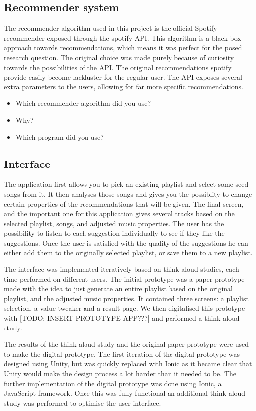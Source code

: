 \documentclass[sigconf,nonacm]{acmart}
\begin{document}
\subsection{Recommender system}
The recommender algorithm used in this project is the official Spotify recommender exposed through the spotify API. This algorithm is a black box approach towards recommendations, which means it was perfect for the posed research question. 
The original choice was made purely because of curiosity towards the possibilities of the API. The original recommendations spotify provide easily become lackluster for the regular user. The API exposes several extra parameters to the users, allowing for far more specific recommendations.
\begin{itemize}
    \item Which recommender algorithm did you use?
    \item Why?
    \item Which program did you use?
\end{itemize}

\subsection{Interface}
The application first allows you to pick an existing playlist and select some seed songs from it. It then analyses those songs and gives you the possiblity to change certain properties of the recommendations that will be given. The final screen, and the important one for this application gives several tracks based on the selected playlist, songs, and adjusted music properties. The user has the possibility to listen to each suggestion individually to see if they like the suggestions. Once the user is satisfied with the quality of the suggestions he can either add them to the originally selected playlist, or save them to a new playlist.

The interface was implemented iteratively based on think aloud studies, each time performed on different users. The initial prototype was a paper prototype made with the idea to just generate an entire playlist based on the original playlist, and the adjusted music properties. It contained three screens: a playlist selection, a value tweaker and a result page. We then digitalised this prototype with [TODO: INSERT PROTOTYPE APP???] and performed a think-aloud study. 

The results of the think aloud study and the original paper prototype were used to make the digital prototype. The first iteration of the digital prototype was designed using Unity, but was quickly replaced with Ionic as it became clear that Unity would make the design process a lot harder than it needed to be. The further implementation of the digital prototype was done using Ionic, a JavaScript framework. Once this was fully functional an additional think aloud study was performed to optimise the user interface.
\end{document}
